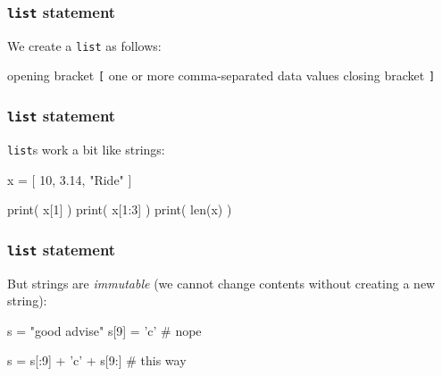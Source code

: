 \documentclass[11pt]{beamer}
\begin{document}
\begin{frame}[fragile]
  \frametitle{\texttt{list} statement}
  \Enlarge

  \begin{itemize}
  \myitem  We create a \texttt{list} as follows:
    \begin{itemize}
    \mysubitem  opening bracket \texttt{[}
    \mysubitem  one or more comma-separated data values
    \mysubitem  closing bracket \texttt{]}
    \end{itemize}
  \end{itemize}
\end{frame}

\begin{frame}[fragile]
  \frametitle{\texttt{list} statement}
  \Enlarge

  \begin{itemize}
  \myitem  \texttt{list}s work a bit like strings:
    \begin{semiverbatim}
x = [ 10, 3.14, "Ride" ]

print( x[1] )
print( x[1:3] )
print( len(x) )
    \end{semiverbatim}
  \end{itemize}
\end{frame}

\begin{frame}[fragile]
  \frametitle{\texttt{list} statement}
  \Enlarge

  \begin{itemize}
  \myitem  But strings are \emph{immutable} (we cannot change contents without creating a new string): %
  \end{itemize}
  \begin{semiverbatim}
s = "good advise"
s[9] = 'c'                 # nope

s = s[:9] + 'c' + s[9:]    # this way
  \end{semiverbatim}
\end{frame}
\end{document}
